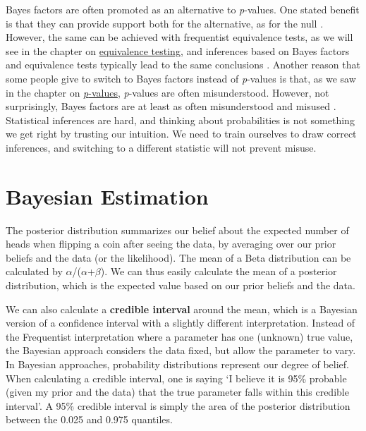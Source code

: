 \documentclass[
  oneside]{book}
\begin{document}
Bayes factors are often promoted as an alternative to \emph{p}-values. One stated benefit is that they can provide support both for the alternative, as for the null \citep{dienes_using_2014}. However, the same can be achieved with frequentist equivalence tests, as we will see in the chapter on \protect\hyperlink{equivalencetest}{equivalence testing}, and inferences based on Bayes factors and equivalence tests typically lead to the same conclusions \citep{lakens_improving_2020}. Another reason that some people give to switch to Bayes factors instead of \emph{p}-values is that, as we saw in the chapter on \protect\hyperlink{misconceptions}{\emph{p}-values}, \emph{p}-values are often misunderstood. However, not surprisingly, Bayes factors are at least as often misunderstood and misused \citep{wong_potential_2021}. Statistical inferences are hard, and thinking about probabilities is not something we get right by trusting our intuition. We need to train ourselves to draw correct inferences, and switching to a different statistic will not prevent misuse.

\hypertarget{bayesest}{%
\section{Bayesian Estimation}\label{bayesest}}

The posterior distribution summarizes our belief about the expected number of heads when flipping a coin after seeing the data, by averaging over our prior beliefs and the data (or the likelihood). The mean of a Beta distribution can be calculated by \(\alpha\)/(\(\alpha\)+\(\beta\)). We can thus easily calculate the mean of a posterior distribution, which is the expected value based on our prior beliefs and the data.

We can also calculate a \textbf{credible interval} around the mean, which is a Bayesian version of a confidence interval with a slightly different interpretation. Instead of the Frequentist interpretation where a parameter has one (unknown) true value, the Bayesian approach considers the data fixed, but allow the parameter to vary. In Bayesian approaches, probability distributions represent our degree of belief. When calculating a credible interval, one is saying `I believe it is 95\% probable (given my prior and the data) that the true parameter falls within this credible interval'. A 95\% credible interval is simply the area of the posterior distribution between the 0.025 and 0.975 quantiles.
\end{document}
